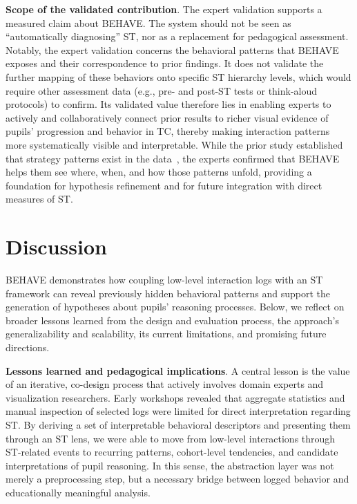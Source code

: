 \documentclass[letterpaper,journal]{IEEEtran}
\begin{document}
\noindent
\textbf{Scope of the validated contribution}.
The expert validation supports a measured claim about \textsc{BEHAVE}.
The system should not be seen as ``automatically diagnosing'' ST, nor as a replacement for pedagogical assessment. 
Notably, the expert validation concerns the behavioral patterns that \textsc{BEHAVE} exposes and their correspondence to prior findings. It does not validate the further mapping of these behaviors onto specific ST hierarchy levels, which would require other assessment data (e.g., pre- and post-ST tests or think-aloud protocols) to confirm.
Its validated value therefore lies in enabling experts to actively and collaboratively connect prior results to richer visual evidence of pupils' progression and behavior in TC, thereby making interaction patterns more systematically visible and interpretable.
While the prior study established that strategy patterns exist in the data~\cite{host2026pupils}, the experts confirmed that \textsc{BEHAVE} helps them see where, when, and how those patterns unfold, providing a foundation for hypothesis refinement and for future integration with direct measures of ST.





\section{Discussion}
\label{sec:discussion}

\textsc{BEHAVE} demonstrates how coupling low-level interaction logs with an ST framework can reveal previously hidden behavioral patterns and support the generation of hypotheses about pupils' reasoning processes. 
Below, we reflect on broader lessons learned from the design and evaluation process, the approach's generalizability and scalability, its current limitations, and promising future directions.

\noindent
\textbf{Lessons learned and pedagogical implications}.
A central lesson is the value of an iterative, co-design process that actively involves domain experts and visualization researchers. 
Early workshops revealed that aggregate statistics and manual inspection of selected logs were limited for direct interpretation regarding ST.
By deriving a set of interpretable behavioral descriptors and presenting them through an ST lens, we were able to move from low-level interactions through ST-related events to recurring patterns, cohort-level tendencies, and candidate interpretations of pupil reasoning.
In this sense, the abstraction layer was not merely a preprocessing step, but a necessary bridge between logged behavior and educationally meaningful analysis.
\end{document}
